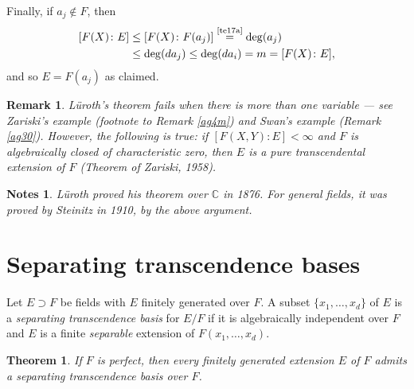 \documentclass[a4paper,11pt,final,openany]{memoir}
\newtheorem{theorem}[X]{Theorem}
\newtheorem{remark}[X]{Remark}
\newtheorem*{nt}{Notes}
\theoremstyle{nonumberplain}
\begin{document}
Finally, if $a_{j}\notin F$, then%
\begin{align*}
\lbrack F(X)\colon E]&\leq\lbrack F(X)\colon F(a_{j}%
)]\overset{\text{\ref{te17a}}}{=}\deg(a_{j})\\
&\leq\deg(da_{j})\leq\deg
(da_{i})=m=[F(X)\colon E],
\end{align*}
and so $E=F(a_{j})$ as claimed.

\begin{remark}
\label{te18}L\"{u}roth's theorem fails when there is more than one variable
--- see Zariski's example (footnote to Remark \ref{ag4m}) and Swan's example
(Remark \ref{ag30}). However, the following is true: if $[F(X,Y)\colon
E]<\infty$ and $F$ is algebraically closed of characteristic zero, then $E$ is
a pure transcendental extension of $F$ (Theorem of Zariski, 1958).
\end{remark}

\begin{nt}
L\"{u}roth proved his theorem over $\mathbb{C}{}$ in 1876. For general fields,
it was proved by Steinitz in 1910, by the above argument.
\end{nt}

\section{Separating transcendence bases}

Let $E\supset F$ be fields with $E$ finitely generated over $F$. A subset
$\{x_{1},\ldots,x_{d}\}$ of $E$ is a%
\emph{separating transcendence basis }for $E/F$ if it is algebraically
independent over $F$ and $E$ is a finite \textit{separable} extension of
$F(x_{1},\ldots,x_{d})$.

\begin{theorem}
\label{te19}If $F$ is perfect, then every finitely generated extension $E$ of
$F$ admits a separating transcendence basis over $F$.
\end{theorem}
\end{document}
